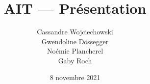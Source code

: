 \documentclass{beamer}
\title{AIT --- Présentation}
\author{Cassandre Wojciechowski \\ Gwendoline Dössegger \\ Noémie Plancherel \\ Gaby Roch}
\date{8 novembre 2021}
\begin{document}
\begin{frame}
  \titlepage
\end{frame}
\end{document}
